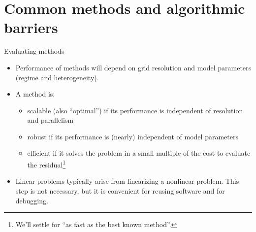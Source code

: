 \documentclass{beamer}
\begin{document}
\section{Common methods and algorithmic barriers}
\begin{frame}{Evaluating methods}
  \begin{itemize}
  \item Performance of methods will depend on \alert{grid resolution} and \alert{model parameters} (regime and heterogeneity).
  \item A method is:
    \begin{itemize}
    \item \alert{scalable} (also ``optimal'') if its performance is independent of resolution and parallelism
    \item \alert{robust} if its performance is (nearly) independent of model parameters
    \item \alert{efficient} if it solves the problem in a small multiple of the cost to evaluate the residual\footnote{We'll settle for ``as fast as the best known method''.}
    \end{itemize}
  \item<2-> Linear problems typically arise from linearizing a nonlinear problem.
    This step is \alert{not necessary}, but it is convenient for \alert{reusing software} and for \alert{debugging}.
  \end{itemize}
\end{frame}
\end{document}

